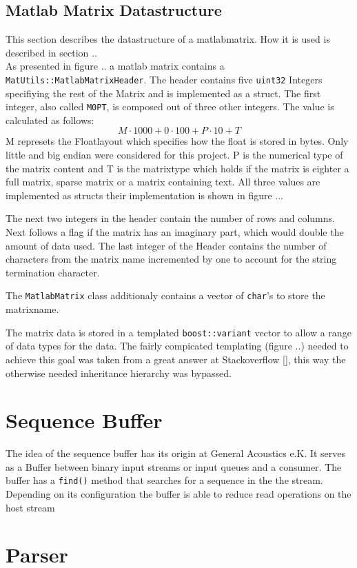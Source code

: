 \subsection{Matlab Matrix Datastructure}
This section describes the datastructure of a matlabmatrix. How it is used is described in section .. \\
As presented in figure .. a matlab matrix contains a \texttt{MatUtils::MatlabMatrixHeader}. The header contains five \texttt{uint32} Integers specifiying the rest of the Matrix and is implemented as a struct. The first integer, also called \texttt{M0PT}, is composed out of three other integers. The value is calculated as follows:
$$M\cdot1000 + 0 \cdot 100 + P\cdot 10 + T$$
M represets the Floatlayout which specifies how the float is stored in bytes. Only little and big endian were considered for this project. P is the numerical type of the matrix content and T is the matrixtype which holds if the matrix is eighter a full matrix, sparse matrix or a matrix containing text. All three values are implemented as structs their implementation is shown in figure ...

The next two integers in the header contain the number of rows and columns. Next follows a flag if the matrix has an imaginary part, which would double the amount of data used. The last integer of the Header contains the number of characters from the matrix name incremented by one to account for the string termination character.

The \texttt{MatlabMatrix} class additionaly contains a vector of \texttt{char}'s to store the matrixname.

The matrix data is stored in a templated \texttt{boost::variant} vector to allow a range of data types for the data. The fairly compicated templating (figure ..) needed to achieve this goal was taken from  a great answer at Stackoverflow [], this way the otherwise needed inheritance hierarchy was bypassed. 

\section{Sequence Buffer}
The idea of the sequence buffer has its origin at General Acoustics e.K. It serves as a Buffer between binary input streams or input queues and a consumer. The buffer has a \texttt{find()} method that searches for a sequence in the  the stream. Depending on its configuration the buffer is able to reduce read operations on the host stream
\section{Parser}
